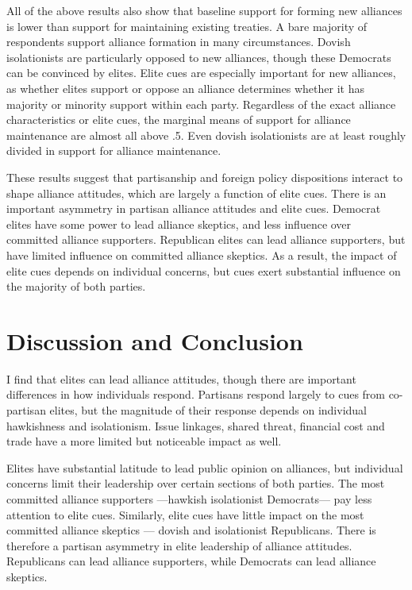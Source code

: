 \documentclass[12pt]{article}
\begin{document}
All of the above results also show that baseline support for forming new alliances is lower than support for maintaining existing treaties. 
A bare majority of respondents support alliance formation in many circumstances. 
Dovish isolationists are particularly opposed to new alliances, though these Democrats can be convinced by elites. 
Elite cues are especially important for new alliances, as whether elites support or oppose an alliance determines whether it has majority or minority support within each party. 
Regardless of the exact alliance characteristics or elite cues, the marginal means of support for alliance maintenance are almost all above .5. 
Even dovish isolationists are at least roughly divided in support for alliance maintenance.


These results suggest that partisanship and foreign policy dispositions interact to shape alliance attitudes, which are largely a function of elite cues. 
There is an important asymmetry in partisan alliance attitudes and elite cues. 
Democrat elites have some power to lead alliance skeptics, and less influence over committed alliance supporters. 
Republican elites can lead alliance supporters, but have limited influence on committed alliance skeptics. 
As a result, the impact of elite cues depends on individual concerns, but cues exert substantial influence on the majority of both parties. 





\section{Discussion and Conclusion} 

I find that elites can lead alliance attitudes, though there are important differences in how individuals respond. 
Partisans respond largely to cues from co-partisan elites, but the magnitude of their response depends on individual hawkishness and isolationism. 
Issue linkages, shared threat, financial cost and trade have a more limited but noticeable  impact as well.  


Elites have substantial latitude to lead public opinion on alliances, but individual concerns limit their leadership over certain sections of both parties. 
The most committed alliance supporters ---hawkish isolationist Democrats--- pay less attention to elite cues.
Similarly, elite cues have little impact on the most committed alliance skeptics --- dovish and isolationist Republicans. 
There is therefore a partisan asymmetry in elite leadership of alliance attitudes. 
Republicans can lead alliance supporters, while Democrats can lead alliance skeptics. 
\end{document}
